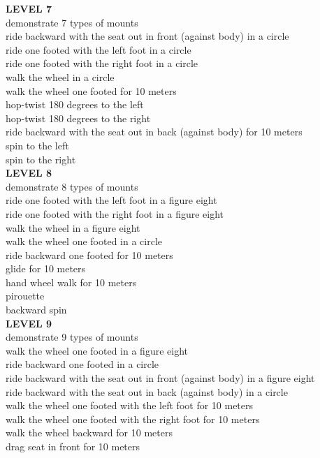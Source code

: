 \textbf{LEVEL 7}\\
demonstrate 7 types of mounts\\
ride backward with the seat out in front (against body) in a circle\\
ride one footed with the left foot in a circle\\
ride one footed with the right foot in a circle\\
walk the wheel in a circle\\
walk the wheel one footed for 10 meters\\
hop-twist 180 degrees to the left\\
hop-twist 180 degrees to the right\\
ride backward with the seat out in back (against body) for 10 meters\\
spin to the left\\
spin to the right\\
\textbf{LEVEL 8}\\
demonstrate 8 types of mounts\\
ride one footed with the left foot in a figure eight\\
ride one footed with the right foot in a figure eight\\
walk the wheel in a figure eight\\
walk the wheel one footed in a circle\\
ride backward one footed for 10 meters\\
glide for 10 meters\\
hand wheel walk for 10 meters\\
pirouette\\
backward spin\\
\textbf{LEVEL 9}\\
demonstrate 9 types of mounts\\
walk the wheel one footed in a figure eight\\
ride backward one footed in a circle\\
ride backward with the seat out in front (against body) in a figure eight\\
ride backward with the seat out in back (against body) in a circle\\
walk the wheel one footed with the left foot for 10 meters\\
walk the wheel one footed with the right foot for 10 meters\\
walk the wheel backward for 10 meters\\
drag seat in front for 10 meters\\
